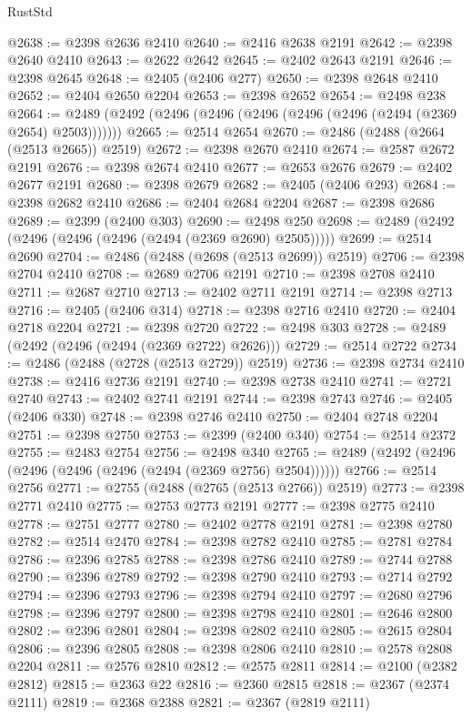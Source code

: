 \begin{lexlean}{RustStd}
\begin{coremodule}
@2638 := @2398 @2636 @2410
@2640 := @2416 @2638 @2191
@2642 := @2398 @2640 @2410
@2643 := @2622 @2642
@2645 := @2402 @2643 @2191
@2646 := @2398 @2645
@2648 := @2405 (@2406 @277)
@2650 := @2398 @2648 @2410
@2652 := @2404 @2650 @2204
@2653 := @2398 @2652
@2654 := @2498 @238
@2664 := @2489 (@2492 (@2496 (@2496 (@2496 (@2496 (@2496 (@2494 (@2369 @2654) @2503)))))))
@2665 := @2514 @2654
@2670 := @2486 (@2488 (@2664 (@2513 @2665)) @2519)
@2672 := @2398 @2670 @2410
@2674 := @2587 @2672 @2191
@2676 := @2398 @2674 @2410
@2677 := @2653 @2676
@2679 := @2402 @2677 @2191
@2680 := @2398 @2679
@2682 := @2405 (@2406 @293)
@2684 := @2398 @2682 @2410
@2686 := @2404 @2684 @2204
@2687 := @2398 @2686
@2689 := @2399 (@2400 @303)
@2690 := @2498 @250
@2698 := @2489 (@2492 (@2496 (@2496 (@2496 (@2494 (@2369 @2690) @2505)))))
@2699 := @2514 @2690
@2704 := @2486 (@2488 (@2698 (@2513 @2699)) @2519)
@2706 := @2398 @2704 @2410
@2708 := @2689 @2706 @2191
@2710 := @2398 @2708 @2410
@2711 := @2687 @2710
@2713 := @2402 @2711 @2191
@2714 := @2398 @2713
@2716 := @2405 (@2406 @314)
@2718 := @2398 @2716 @2410
@2720 := @2404 @2718 @2204
@2721 := @2398 @2720
@2722 := @2498 @303
@2728 := @2489 (@2492 (@2496 (@2494 (@2369 @2722) @2626)))
@2729 := @2514 @2722
@2734 := @2486 (@2488 (@2728 (@2513 @2729)) @2519)
@2736 := @2398 @2734 @2410
@2738 := @2416 @2736 @2191
@2740 := @2398 @2738 @2410
@2741 := @2721 @2740
@2743 := @2402 @2741 @2191
@2744 := @2398 @2743
@2746 := @2405 (@2406 @330)
@2748 := @2398 @2746 @2410
@2750 := @2404 @2748 @2204
@2751 := @2398 @2750
@2753 := @2399 (@2400 @340)
@2754 := @2514 @2372
@2755 := @2483 @2754
@2756 := @2498 @340
@2765 := @2489 (@2492 (@2496 (@2496 (@2496 (@2496 (@2494 (@2369 @2756) @2504))))))
@2766 := @2514 @2756
@2771 := @2755 (@2488 (@2765 (@2513 @2766)) @2519)
@2773 := @2398 @2771 @2410
@2775 := @2753 @2773 @2191
@2777 := @2398 @2775 @2410
@2778 := @2751 @2777
@2780 := @2402 @2778 @2191
@2781 := @2398 @2780
@2782 := @2514 @2470
@2784 := @2398 @2782 @2410
@2785 := @2781 @2784
@2786 := @2396 @2785
@2788 := @2398 @2786 @2410
@2789 := @2744 @2788
@2790 := @2396 @2789
@2792 := @2398 @2790 @2410
@2793 := @2714 @2792
@2794 := @2396 @2793
@2796 := @2398 @2794 @2410
@2797 := @2680 @2796
@2798 := @2396 @2797
@2800 := @2398 @2798 @2410
@2801 := @2646 @2800
@2802 := @2396 @2801
@2804 := @2398 @2802 @2410
@2805 := @2615 @2804
@2806 := @2396 @2805
@2808 := @2398 @2806 @2410
@2810 := @2578 @2808 @2204
@2811 := @2576 @2810
@2812 := @2575 @2811
@2814 := @2100 (@2382 @2812)
@2815 := @2363 @22
@2816 := @2360 @2815
@2818 := @2367 (@2374 @2111)
@2819 := @2368 @2388
@2821 := @2367 (@2819 @2111)

\end{coremodule}
\end{lexlean}

